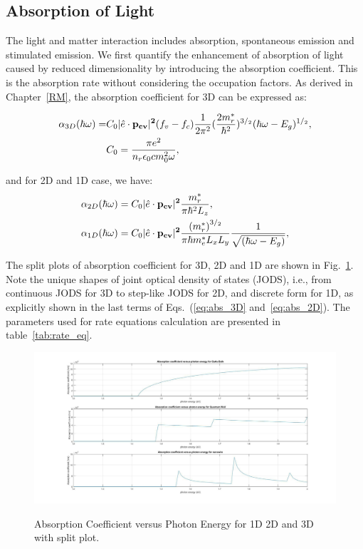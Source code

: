 \subsection{Absorption of Light}

The light and matter interaction includes absorption, spontaneous emission and
stimulated emission. We first quantify the enhancement of absorption of light caused by reduced dimensionality by introducing
the absorption coefficient. This is the absorption rate without considering the
occupation factors. As derived in Chapter~\ref{RM}, the absorption
coefficient for 3D can be expressed as:

\begin{eqnarray}
    \alpha_{3D}(\hbar\omega)= & C_0{|\hat{e}\cdot\bf{p}_{cv}|^2}(f_v-f_c) \frac{1}{2\pi^2}(\frac{2m_r^\ast}{\hbar^2})^{3/_2}(\hbar\omega-E_g)^{1/_2}, \nonumber \\
    & C_0=\frac{\pi{e^2}}{n_r\epsilon_0{c}{m_0^2}\omega},
    \label{eq:abs_3D}
\end{eqnarray}

and for 2D and 1D case, we have:
\begin{eqnarray}
\begin{aligned}
& \alpha_{2D}(\hbar\omega)=C_0{|\hat{e}\cdot\bf{p}_{cv}|^2}\frac{m_r^\ast}{\pi\hbar^2{L_z}},
\\
& \alpha_{1D}(\hbar\omega)=C_0{|\hat{e}\cdot\bf{p}_{cv}|^2}\frac{{(m_r^\ast)}^{3/_2}}{\pi\hbar{m_e^\ast}{L_x}{L_y}}\frac{1}{\sqrt{(\hbar\omega-E_g)}},
    \label{eq:abs_2D}
\end{aligned}
\end{eqnarray}

The split plots of absorption coefficient for 3D, 2D and 1D are shown in
Fig.~\ref{absrate_split}. Note the unique shapes of joint optical density of
states (JODS), i.e., from continuous JODS for 3D to step-like JODS for 2D, and
discrete form for 1D, as explicitly shown in the last terms of
Eqs.~(\ref{eq:abs_3D} and~\ref{eq:abs_2D}). The parameters used for rate
equations calculation are presented in table~\ref{tab:rate_eq}.

\begin{figure}
  \caption{Absorption Coefficient versus Photon Energy for 1D 2D and 3D with split plot.}
  \centering
  \includegraphics[width=\textwidth]{pictures/LT/absrate_split}
  \label{absrate_split}
\end{figure}

